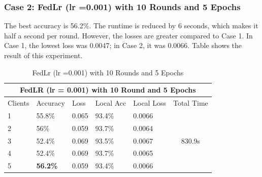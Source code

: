\documentclass[conference]{IEEEtran}
\newcommand{\RNum}[1]{\uppercase\expandafter{\romannumeral #1\relax}}
\begin{document}
 \subsubsection{Case 2: FedLr (lr =0.001) with 10 Rounds and 5 Epochs}
 The best accuracy is 56.2\%. The runtime is reduced by 6 seconds, which makes it half a second per round. However, the losses are greater compared to Case 1. In Case 1, the lowest loss was 0.0047; in Case 2, it was 0.0066. Table \RNum{2} shows the result of this experiment.
 \begin{table}[ht]
 	\centering
 	\caption{FedLr (lr =0.001) with 10 Rounds and 5 Epochs}
 		\begin{tabular}{|lllllc|}
 			\hline
 			\multicolumn{6}{|c|}{FedLR (lr = 0.001) with 10 Round and 5 Epochs}                                                                                                                             \\ \hline
 			\multicolumn{1}{|l|}{Clients} & \multicolumn{1}{l|}{Accuracy} & \multicolumn{1}{l|}{Loss}  & \multicolumn{1}{l|}{Local Acc} & \multicolumn{1}{l|}{Local Loss} & \multicolumn{1}{l|}{Total Time} \\ \hline
 			\multicolumn{1}{|l|}{1}       & \multicolumn{1}{l|}{55.8\%}   & \multicolumn{1}{l|}{0.065} & \multicolumn{1}{l|}{93.4\%}    & \multicolumn{1}{l|}{0.0066}     & \multirow{5}{*}{830.9s}         \\ \cline{1-5}
 			\multicolumn{1}{|l|}{2}       & \multicolumn{1}{l|}{56\%}     & \multicolumn{1}{l|}{0.059} & \multicolumn{1}{l|}{93.7\%}    & \multicolumn{1}{l|}{0.0064}     &                                 \\ \cline{1-5}
 			\multicolumn{1}{|l|}{3}       & \multicolumn{1}{l|}{52.4\%}   & \multicolumn{1}{l|}{0.069} & \multicolumn{1}{l|}{93.5\%}    & \multicolumn{1}{l|}{0.0067}     &                                 \\ \cline{1-5}
 			\multicolumn{1}{|l|}{4}       & \multicolumn{1}{l|}{52.4\%}   & \multicolumn{1}{l|}{0.069} & \multicolumn{1}{l|}{93.7\%}    & \multicolumn{1}{l|}{0.0065}     &                                 \\ \cline{1-5}
 			\multicolumn{1}{|l|}{5}       & \multicolumn{1}{l|}{\textbf{56.2\%}}   & \multicolumn{1}{l|}{0.059} & \multicolumn{1}{l|}{93.4\%}    & \multicolumn{1}{l|}{0.0066}     &                                 \\ \hline
 		\end{tabular}%
 \end{table}
 
\end{document}
